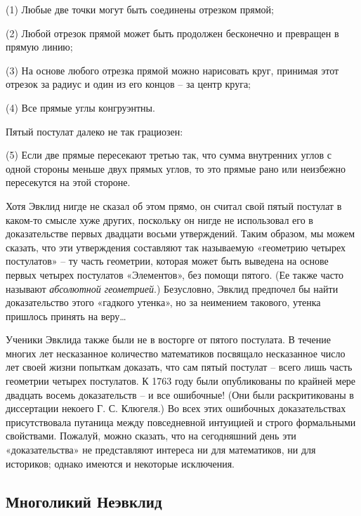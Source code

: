 \documentclass[../main.tex]{subfiles}
\begin{document}
(1) Любые две точки могут быть соединены отрезком прямой;

(2) Любой отрезок прямой может быть продолжен бесконечно и превращен в прямую линию;

(3) На основе любого отрезка прямой можно нарисовать круг, принимая этот отрезок за радиус и один из его концов \--- за центр круга;

(4) Все прямые углы конгруэнтны.

Пятый постулат далеко не так грациозен:

(5) Если две прямые пересекают третью так, что сумма внутренних углов с одной стороны меньше двух прямых углов, то это прямые рано или неизбежно пересекутся на этой стороне.

Хотя Эвклид нигде не сказал об этом прямо, он считал свой пятый постулат в каком-то смысле хуже других, поскольку он нигде не использовал его в доказательстве первых двадцати восьми утверждений. Таким образом, мы можем сказать, что эти утверждения составляют так называемую «геометрию четырех постулатов» \--- ту часть геометрии, которая может быть выведена на основе первых четырех постулатов «Элементов», без помощи пятого. (Ее также часто называют \emph{абсолютной геометрией}.) Безусловно, Эвклид предпочел бы найти доказательство этого «гадкого утенка», но за неимением такового, утенка пришлось принять на веру\ldots{}

Ученики Эвклида также были не в восторге от пятого постулата. В течение многих лет несказанное количество математиков посвящало несказанное число лет своей жизни попыткам доказать, что сам пятый постулат \--- всего лишь часть геометрии четырех постулатов. К 1763 году были опубликованы по крайней мере двадцать восемь доказательств \--- и все ошибочные! (Они были раскритикованы в диссертации некоего Г. С. Клюгеля.) Во всех этих ошибочных доказательствах присутствовала путаница между повседневной интуицией и строго формальными свойствами. Пожалуй, можно сказать, что на сегодняшний день эти «доказательства» не представляют интереса ни для математиков, ни для историков; однако имеются и некоторые исключения.


\subsection{Многоликий Неэвклид}
\end{document}
